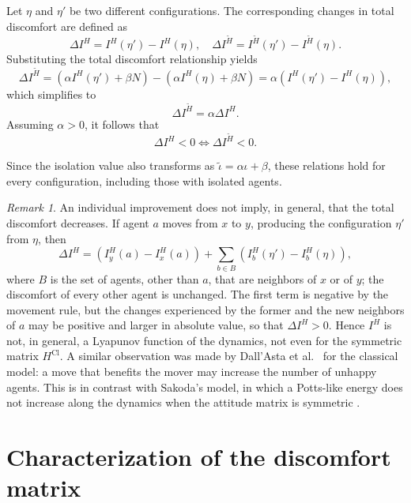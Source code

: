 \documentclass{article}
\theoremstyle{remark}
\newtheorem{remark}{Remark}
\begin{document}
Let $\eta$ and $\eta'$ be two different configurations. The corresponding changes in total discomfort are defined as
\[
\Delta I^H = I^H(\eta') - I^H(\eta), \quad \Delta I^{\widetilde{H}} = I^{\widetilde{H}}(\eta') - I^{\widetilde{H}}(\eta).
\]
Substituting the total discomfort relationship yields
\[
\Delta I^{\widetilde{H}} = \left(\alpha I^H(\eta') + \beta N\right) - \left(\alpha I^H(\eta) + \beta N\right)=\alpha \left(I^H(\eta') - I^H(\eta)\right),
\]
which simplifies to
\[
\Delta I^{\widetilde{H}} = \alpha \Delta I^H.
\]
Assuming $\alpha > 0$, it follows that
\[
\Delta I^H < 0 \iff \Delta I^{\widetilde{H}} < 0.
\]

Since the isolation value also transforms as $\widetilde\iota=\alpha\iota+\beta$, these relations hold for every configuration, including those with isolated agents.

\begin{remark}
An individual improvement does not imply, in general, that the total discomfort decreases. If agent $a$ moves from $x$ to $y$, producing the configuration $\eta'$ from $\eta$, then
\[
\Delta I^H = \left(I_y^H(a)-I_x^H(a)\right) + \sum_{b \in B} \left(I_b^H(\eta')-I_b^H(\eta)\right),
\]
where $B$ is the set of agents, other than $a$, that are neighbors of $x$ or of $y$; the discomfort of every other agent is unchanged. The first term is negative by the movement rule, but the changes experienced by the former and the new neighbors of $a$ may be positive and larger in absolute value, so that $\Delta I^H>0$. Hence $I^H$ is not, in general, a Lyapunov function of the dynamics, not even for the symmetric matrix $H^{\mathrm{Cl}}$. A similar observation was made by Dall'Asta et al.\ \cite{dallasta2008statistical} for the classical model: a move that benefits the mover may increase the number of unhappy agents. This is in contrast with Sakoda's model, in which a Potts-like energy does not increase along the dynamics when the attitude matrix is symmetric \cite{medina2017self,goles2020migration}.
\end{remark}

\section{Characterization of the discomfort matrix}
\end{document}
